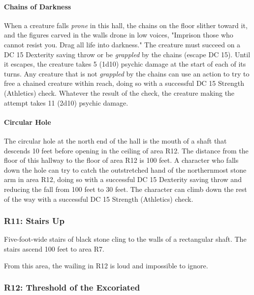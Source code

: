 \documentclass[letterpaper, 11pt, bg=full, twocolumn]{dndbook}
\begin{document}
\paragraph{Chains of Darkness}

When a creature falls \textit{prone} in this hall, the chains on the floor slither toward it, and the figures carved in the walls drone in low voices, "Imprison those who cannot resist you. Drag all life into darkness." The creature must succeed on a DC 15 Dexterity saving throw or be \textit{grappled} by the chains (escape DC 15). Until it escapes, the creature takes 5 (1d10) psychic damage at the start of each of its turns. Any creature that is not \textit{grappled} by the chains can use an action to try to free a chained creature within reach, doing so with a successful DC 15 Strength (Athletics) check. Whatever the result of the check, the creature making the attempt takes 11 (2d10) psychic damage.

\paragraph{Circular Hole}

The circular hole at the north end of the hall is the mouth of a shaft that descends 10 feet before opening in the ceiling of area R12. The distance from the floor of this hallway to the floor of area R12 is 100 feet. A character who falls down the hole can try to catch the outstretched hand of the northernmost stone arm in area R12, doing so with a successful DC 15 Dexterity saving throw and reducing the fall from 100 feet to 30 feet. The character can climb down the rest of the way with a successful DC 15 Strength (Athletics) check.

\subsubsection{R11: Stairs Up}

Five-foot-wide stairs of black stone cling to the walls of a rectangular shaft. The stairs ascend 100 feet to area R7.

From this area, the wailing in R12 is loud and impossible to ignore.

\subsubsection{R12: Threshold of the Excoriated}
\end{document}
